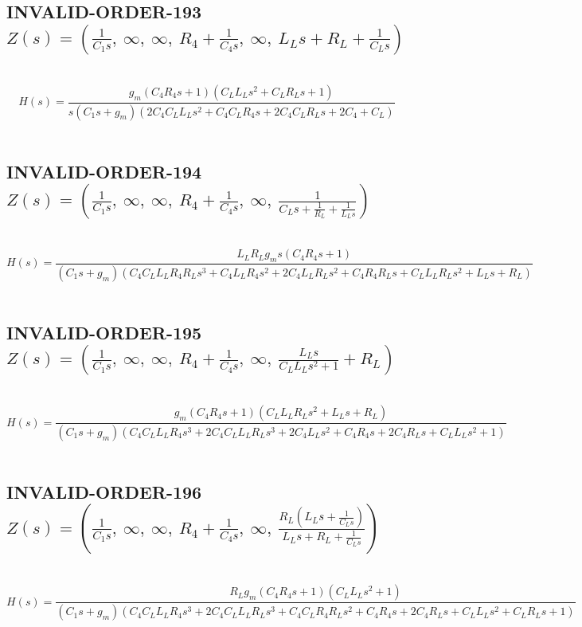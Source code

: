 \documentclass{article}
\begin{document}
\subsection{INVALID-ORDER-193 $Z(s) = \left( \frac{1}{C_{1} s}, \  \infty, \  \infty, \  R_{4} + \frac{1}{C_{4} s}, \  \infty, \  L_{L} s + R_{L} + \frac{1}{C_{L} s}\right)$ } \ 
\textbf{\[H(s) = \frac{g_{m} \left(C_{4} R_{4} s + 1\right) \left(C_{L} L_{L} s^{2} + C_{L} R_{L} s + 1\right)}{s \left(C_{1} s + g_{m}\right) \left(2 C_{4} C_{L} L_{L} s^{2} + C_{4} C_{L} R_{4} s + 2 C_{4} C_{L} R_{L} s + 2 C_{4} + C_{L}\right)}\] } \ 
\subsection{INVALID-ORDER-194 $Z(s) = \left( \frac{1}{C_{1} s}, \  \infty, \  \infty, \  R_{4} + \frac{1}{C_{4} s}, \  \infty, \  \frac{1}{C_{L} s + \frac{1}{R_{L}} + \frac{1}{L_{L} s}}\right)$ } \ 
\textbf{\[H(s) = \frac{L_{L} R_{L} g_{m} s \left(C_{4} R_{4} s + 1\right)}{\left(C_{1} s + g_{m}\right) \left(C_{4} C_{L} L_{L} R_{4} R_{L} s^{3} + C_{4} L_{L} R_{4} s^{2} + 2 C_{4} L_{L} R_{L} s^{2} + C_{4} R_{4} R_{L} s + C_{L} L_{L} R_{L} s^{2} + L_{L} s + R_{L}\right)}\] } \ 
\subsection{INVALID-ORDER-195 $Z(s) = \left( \frac{1}{C_{1} s}, \  \infty, \  \infty, \  R_{4} + \frac{1}{C_{4} s}, \  \infty, \  \frac{L_{L} s}{C_{L} L_{L} s^{2} + 1} + R_{L}\right)$ } \ 
\textbf{\[H(s) = \frac{g_{m} \left(C_{4} R_{4} s + 1\right) \left(C_{L} L_{L} R_{L} s^{2} + L_{L} s + R_{L}\right)}{\left(C_{1} s + g_{m}\right) \left(C_{4} C_{L} L_{L} R_{4} s^{3} + 2 C_{4} C_{L} L_{L} R_{L} s^{3} + 2 C_{4} L_{L} s^{2} + C_{4} R_{4} s + 2 C_{4} R_{L} s + C_{L} L_{L} s^{2} + 1\right)}\] } \ 
\subsection{INVALID-ORDER-196 $Z(s) = \left( \frac{1}{C_{1} s}, \  \infty, \  \infty, \  R_{4} + \frac{1}{C_{4} s}, \  \infty, \  \frac{R_{L} \left(L_{L} s + \frac{1}{C_{L} s}\right)}{L_{L} s + R_{L} + \frac{1}{C_{L} s}}\right)$ } \ 
\textbf{\[H(s) = \frac{R_{L} g_{m} \left(C_{4} R_{4} s + 1\right) \left(C_{L} L_{L} s^{2} + 1\right)}{\left(C_{1} s + g_{m}\right) \left(C_{4} C_{L} L_{L} R_{4} s^{3} + 2 C_{4} C_{L} L_{L} R_{L} s^{3} + C_{4} C_{L} R_{4} R_{L} s^{2} + C_{4} R_{4} s + 2 C_{4} R_{L} s + C_{L} L_{L} s^{2} + C_{L} R_{L} s + 1\right)}\] } \ 
\end{document}
